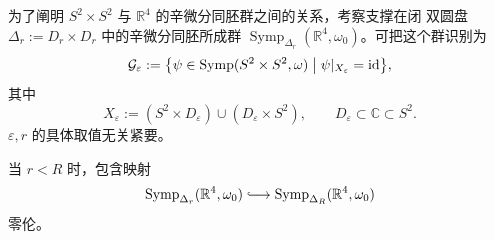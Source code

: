 为了阐明 $S^2\times S^2$ 与 $\mathbb R^4$ 的辛微分同胚群之间的关系，考察支撑在闭
双圆盘 $\Delta_r:=D_r\times D_r$ 中的辛微分同胚所成群
$\operatorname{Symp}_{\Delta_r}(\mathbb R^4,\omega_0)$。可把这个群识别为
\[
  \mathcal G_\varepsilon
  :=\bigl\{\psi\in\operatorname{Symp}(S^2\times S^2,\omega)
    \bigm|\psi|_{X_\varepsilon}=\operatorname{id}\bigr\},
\]
其中
\[
  X_\varepsilon:=(S^2\times D_\varepsilon)\cup(D_\varepsilon\times S^2),
  \qquad D_\varepsilon\subset\mathbb C\subset S^2.
\]
$\varepsilon,r$ 的具体取值无关紧要。

\begin{lemma}\label{lem:9-5-6}
当 $r<R$ 时，包含映射
\[
  \operatorname{Symp}_{\Delta_r}(\mathbb R^4,\omega_0)
  \lhook\joinrel\longrightarrow
  \operatorname{Symp}_{\Delta_R}(\mathbb R^4,\omega_0)
\]
零伦。
\end{lemma}

